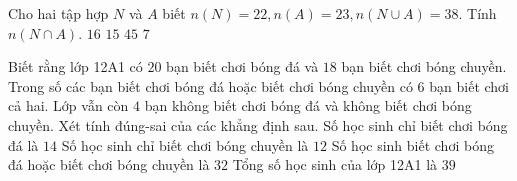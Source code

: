 \begin{ex}
 Cho hai tập hợp ${N}$ và ${A}$ biết $n(N)=22,n(A)=23, n(N\cup A)=38$. Tính $n(N\cap A)$. 
\choice
{ ${16}$ }
   { ${15}$ }
     { ${45}$ }
    { \True ${7}$ }
\end{ex}
\begin{ex}
 Biết rằng lớp 12A1 có ${20}$ bạn biết chơi bóng đá và ${18}$ bạn biết chơi bóng chuyền. Trong số các bạn biết chơi bóng đá hoặc biết chơi bóng chuyền có ${6}$ bạn biết chơi cả hai. Lớp vẫn còn ${4}$ bạn không biết chơi bóng đá và không biết chơi bóng chuyền. Xét tính đúng-sai của các khẳng định sau.
\choiceTFt
{ \True Số học sinh chỉ biết chơi bóng đá là ${14}$ }
   { \True Số học sinh chỉ biết chơi bóng chuyền là ${12}$ }
     { \True Số học sinh biết chơi bóng đá hoặc biết chơi bóng chuyền là ${32}$ }
    { Tổng số học sinh của lớp 12A1 là ${39}$ }
\end{ex}

